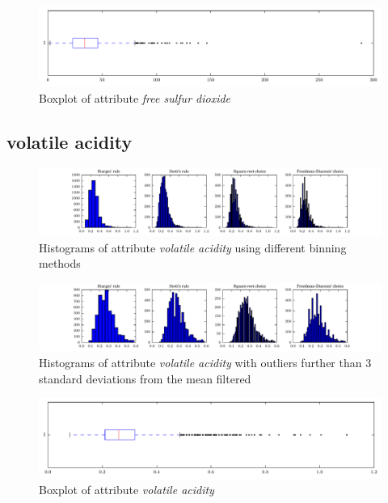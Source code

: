 \documentclass{report}
\begin{document}
\begin{figure}[H]
\includegraphics[width=\textwidth]{boxplots/free_sulfur_dioxide.pdf}
\caption{Boxplot of attribute \emph{free sulfur dioxide}}\end{figure}

\newpage\subsection{volatile acidity}
\begin{figure}[H]
\includegraphics[width=\textwidth]{histograms/volatile_acidity.pdf}
\caption{Histograms of attribute \emph{volatile acidity} using different binning methods}\end{figure}

\begin{figure}[H]
\includegraphics[width=\textwidth]{histograms/volatile_acidity_filtered.pdf}
\caption{Histograms of attribute \emph{volatile acidity} with outliers further than 3 standard deviations from the mean filtered}
\end{figure}

\begin{figure}[H]
\includegraphics[width=\textwidth]{boxplots/volatile_acidity.pdf}
\caption{Boxplot of attribute \emph{volatile acidity}}\end{figure}
\end{document}
